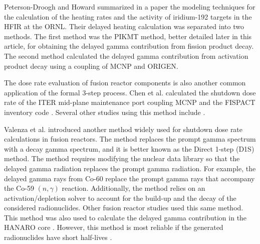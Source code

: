 \documentclass{style/nseJournal}
\begin{document}
Peterson-Droogh and Howard \cite{peterson-droogh_current_2018} summarized in a paper the modeling techniques for the calculation of the heating rates and the activity of iridium-192 targets in the \gls*{HFIR} at the \gls*{ORNL}.
Their delayed heating calculation was separated into two methods.
The first method was the PIKMT method, better detailed later in this article, for obtaining the delayed gamma contribution from fission product decay.
The second method calculated the delayed gamma contribution from activation product decay using a coupling of MCNP and ORIGEN.

The dose rate evaluation of fusion reactor components is also another common application of the formal 3-step process.
Chen et al. \cite{chen_rigorous_2002} calculated the shutdown dose rate of the ITER mid-plane maintenance port coupling MCNP and the FISPACT inventory code \cite{forrest_fispact_1998}.
Several other studies using this method include \cite{serikov_advanced_2002, sauvan_development_2016}.

Valenza et al. \cite{valenza_proposal_2001} introduced another method widely used for shutdown dose rate calculations in fusion reactors.
The method replaces the prompt gamma spectrum with a decay gamma spectrum, and it is better known as the Direct 1-step (D1S) method.
The method requires modifying the nuclear data library so that the delayed gamma radiation replaces the prompt gamma radiation.
For example, the delayed gamma rays from Co-60 replace the prompt gamma rays that accompany the Co-59 $(n, \gamma)$ reaction.
Additionally, the method relies on an activation/depletion solver to account for the build-up and the decay of the considered radionuclides.
Other fusion reactor studies \cite{petrizzi_improvement_2001, palermo_shutdown_2017} used this same method.
This method was also used to calculate the delayed gamma contribution in the HANARO core \cite{lee_analysis_2008}.
However, this method is most reliable if the generated radionuclides have short half-lives \cite{noh_estimation_2018}.
\end{document}
